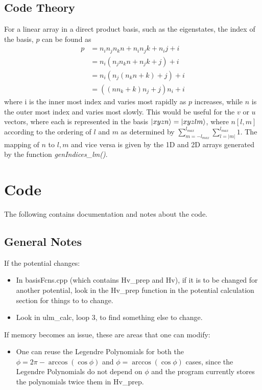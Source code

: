 \documentclass{revtex4-1}
\begin{document}


\subsection{Code Theory}\label{S:CodeTheory}
For a linear array in a direct product basis, such as the eigenstates, the index of the basis, $p$ can be found as
\begin{align}
p &= n_{i}n_{j}n_{k}n + n_{i}n_{j}k + n_{i}j + i\\
  &= n_{i}(n_{j}n_{k}n + n_{j}k + j) + i\\
  &= n_{i}(n_{j}(n_{k}n + k) + j) + i\\
  &= ((nn_{k}+k)n_{j} + j)n_{i} + i
\end{align}
where i is the inner most index and varies most rapidly as $p$ increases, while $n$ is the outer most index and varies most slowly. This would be useful for the $v$ or $u$ vectors, where each is represented in the basis $\ket{xyzn} = \ket{xyzlm}$, where $n[l,m]$ according to the ordering of $l$ and $m$ as determined by $\sum_{m=-l_{max}}^{l_{max}}\sum_{l=|m|}^{l_{max}}1$. The mapping of $n$ to $l,m$ and vice versa is given by the 1D and 2D arrays generated by the function {\em genIndices\_lm()}.
													

\section{Code}\label{S:code}
The following contains documentation and notes about the code.

\subsection{General Notes}\label{S:CodeNotes}

If the potential changes:
\begin{itemize}
\item In basisFcns.cpp (which contains Hv\_prep and Hv), if it is to be changed for another potential, look in the Hv\_prep function in the potential calculation section for things to to change. 
\item Look in ulm\_calc, loop 3, to find something else to change.
\end{itemize}
	
If memory becomes an issue, these are areas that one can modify:
\begin{itemize}
\item One can reuse the Legendre Polynomials for both the $\phi = 2\pi - \arccos(\cos \phi)$ and $\phi = \arccos(\cos \phi)$ cases, since the Legendre Polynomials do not depend on $\phi$ and the program currently stores the polynomials twice them in Hv\_prep.
\end{itemize}
\end{document}
